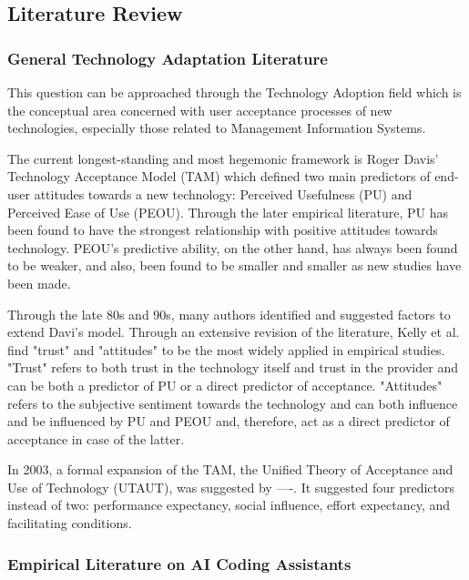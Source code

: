 \subsection{Literature Review}
\subsubsection{General Technology Adaptation Literature}
This question can be approached through the Technology Adoption field which is the conceptual area concerned with user acceptance processes of new technologies, especially those related to Management Information Systems.

The current longest-standing and most hegemonic framework is Roger Davis' Technology Acceptance Model (TAM) which defined two main predictors of end-user attitudes towards a new technology: Perceived Usefulness (PU) and Perceived Ease of Use (PEOU). Through the later empirical literature, PU has been found to have the strongest relationship with positive attitudes towards technology. PEOU's predictive ability, on the other hand, has always been found to be weaker, and also, been found to be smaller and smaller as new studies have been made. 

Through the late 80s and 90s, many authors identified and suggested factors to extend Davi's model. Through an extensive revision of the literature, Kelly et al. find "trust" and "attitudes" to be the most widely applied in empirical studies. "Trust" refers to both trust in the technology itself and trust in the provider and can be both a predictor of PU or a direct predictor of acceptance. "Attitudes" refers to the subjective sentiment towards the technology and can both influence and be influenced by PU and PEOU and, therefore, act as a direct predictor of acceptance in case of the latter. 

In 2003, a formal expansion of the TAM, the Unified Theory of Acceptance and Use of Technology (UTAUT), was suggested by ----. It suggested four predictors instead of two: performance expectancy, social influence, effort expectancy, and facilitating conditions. 

\subsubsection{Empirical Literature on AI Coding Assistants}